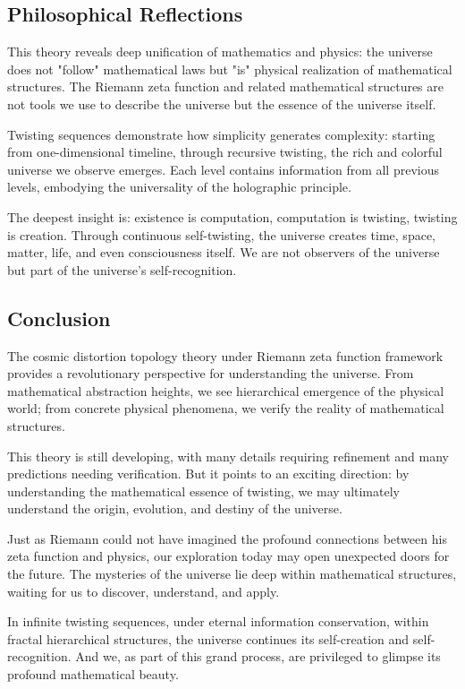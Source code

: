 \documentclass[11pt]{article}
\begin{document}
\subsection{Philosophical Reflections}

This theory reveals deep unification of mathematics and physics: the universe does not "follow" mathematical laws but "is" physical realization of mathematical structures. The Riemann zeta function and related mathematical structures are not tools we use to describe the universe but the essence of the universe itself.

Twisting sequences demonstrate how simplicity generates complexity: starting from one-dimensional timeline, through recursive twisting, the rich and colorful universe we observe emerges. Each level contains information from all previous levels, embodying the universality of the holographic principle.

The deepest insight is: existence is computation, computation is twisting, twisting is creation. Through continuous self-twisting, the universe creates time, space, matter, life, and even consciousness itself. We are not observers of the universe but part of the universe's self-recognition.

\subsection{Conclusion}

The cosmic distortion topology theory under Riemann zeta function framework provides a revolutionary perspective for understanding the universe. From mathematical abstraction heights, we see hierarchical emergence of the physical world; from concrete physical phenomena, we verify the reality of mathematical structures.

This theory is still developing, with many details requiring refinement and many predictions needing verification. But it points to an exciting direction: by understanding the mathematical essence of twisting, we may ultimately understand the origin, evolution, and destiny of the universe.

Just as Riemann could not have imagined the profound connections between his zeta function and physics, our exploration today may open unexpected doors for the future. The mysteries of the universe lie deep within mathematical structures, waiting for us to discover, understand, and apply.

In infinite twisting sequences, under eternal information conservation, within fractal hierarchical structures, the universe continues its self-creation and self-recognition. And we, as part of this grand process, are privileged to glimpse its profound mathematical beauty.
\end{document}

